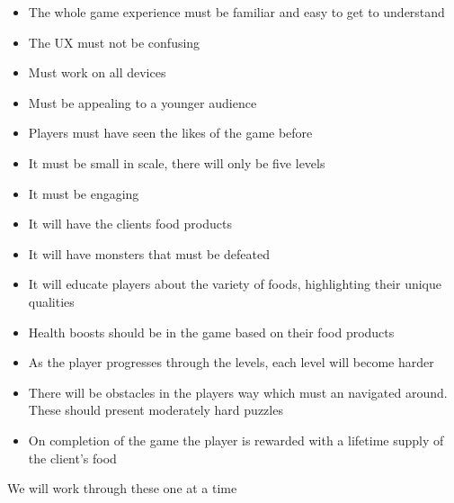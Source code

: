 \documentclass{article}
\begin{document}
\begin{itemize}
\item The whole game experience must be familiar and easy to get to understand
\item The UX must not be confusing
\item Must work on all devices
\item Must be appealing to a younger audience
\item Players must have seen the likes of the game before
\item It must be small in scale, there will only be five levels
\item It must be engaging
\item It will have the clients food products
\item It will have monsters that must be defeated
\item It will educate players about the variety of foods, highlighting their unique qualities
\item Health boosts should be in the game based on their food products
\item As the player progresses through the levels, each level will become harder
\item There will be obstacles in the players way which must an navigated around. These should present moderately hard puzzles
\item On completion of the game the player is rewarded with a lifetime supply of the client's food
\end{itemize}

We will work through these one at a time
\end{document}
